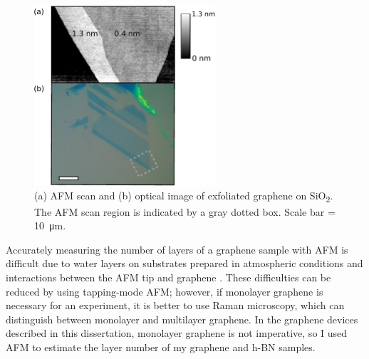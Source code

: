 \documentclass{beavtex_dub_edit}
\begin{document}
\begin{figure}
    \centering
    \includegraphics[width = 0.6\textwidth]{graphene layer comparison.pdf}
    \caption{(a) AFM scan and (b) optical image of exfoliated graphene on SiO\textsubscript{2}. The AFM scan region is indicated by a gray dotted box. Scale bar = \SI{10}{\micro\meter}.}
    \label{fig:graphenelayer}
\end{figure}
Accurately measuring the number of layers of a graphene sample with AFM is difficult due to water layers on substrates prepared in atmospheric conditions and interactions between the AFM tip and graphene \cite{shearer_accurate_2016}. These difficulties can be reduced by using tapping-mode AFM; however, if monolayer graphene is necessary for an experiment, it is better to use Raman microscopy, which can distinguish between monolayer and multilayer graphene. In the graphene devices described in this dissertation, monolayer graphene is not imperative, so I used AFM to estimate the layer number of my graphene and h-BN samples.
\end{document}
